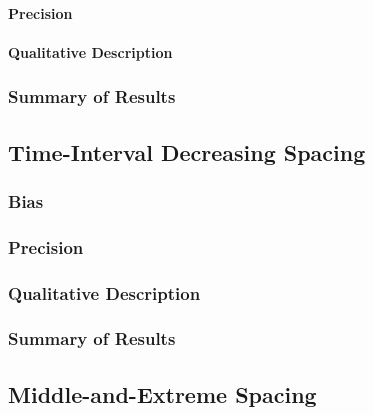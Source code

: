 \documentclass[
12pt, %
twoside,
english]{guelphthesis}
\begin{document}
\hypertarget{precision-time-inc-exp2}{%
\paragraph{Precision}\label{precision-time-inc-exp2}}

\hypertarget{qualitative-time-inc-exp2}{%
\paragraph{Qualitative Description}\label{qualitative-time-inc-exp2}}

\hypertarget{summary-of-results-5}{%
\subsubsection{Summary of Results}\label{summary-of-results-5}}

\hypertarget{time-interval-decreasing-spacing-1}{%
\subsection{Time-Interval Decreasing Spacing}\label{time-interval-decreasing-spacing-1}}

\hypertarget{bias-time-dec-exp2}{%
\subsubsection{Bias}\label{bias-time-dec-exp2}}

\hypertarget{precision-time-dec-exp2}{%
\subsubsection{Precision}\label{precision-time-dec-exp2}}

\hypertarget{qualitative-time-dec-exp2}{%
\subsubsection{Qualitative Description}\label{qualitative-time-dec-exp2}}

\hypertarget{summary-of-results-6}{%
\subsubsection{Summary of Results}\label{summary-of-results-6}}

\hypertarget{middle-and-extreme-spacing-1}{%
\subsection{Middle-and-Extreme Spacing}\label{middle-and-extreme-spacing-1}}
\end{document}
